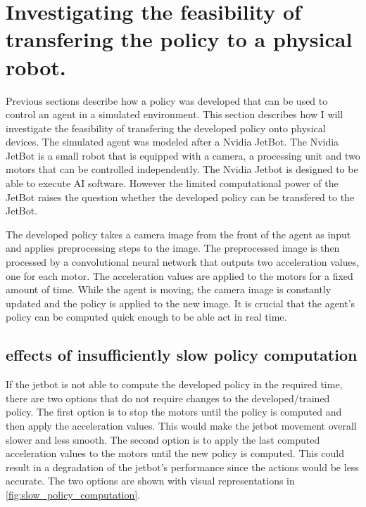 
\section{Investigating the feasibility of transfering the policy to a physical robot.}

Previous sections describe how a policy was developed that can be used to control an agent in a simulated environment. This section describes how I will investigate the feasibility of transfering the developed policy onto physical devices. The simulated agent was modeled after a Nvidia JetBot. The Nvidia JetBot is a small robot that is equipped with a camera, a processing unit and two motors that can be controlled independently. 
The Nvidia Jetbot is designed to be able to execute AI software. However the limited computational power of the JetBot raises the question whether the developed policy can be transfered to the JetBot. 

The developed policy takes a camera image from the front of the agent as input and applies preprocessing steps to the image. The preprocessed image is then processed by a convolutional neural network that outputs two acceleration values, one for each motor. The acceleration values are applied to the motors for a fixed amount of time. While the agent is moving, the camera image is constantly updated and the policy is applied to the new image. It is crucial that the agent's policy can be computed quick enough to be able act in real time. 

\subsection{effects of insufficiently slow policy computation}
If the jetbot is not able to compute the developed policy in the required time, there are two options that do not require changes to the developed/trained policy. The first option is to stop the motors until the policy is computed and then apply the acceleration values. This would make the jetbot movement overall slower and less smooth.
The second option is to apply the last computed acceleration values to the motors until the new policy is computed. This could result in a degradation of the jetbot's performance since the actions would be less accurate.
The two options are shown with visual representations in \ref{fig:slow_policy_computation}.






